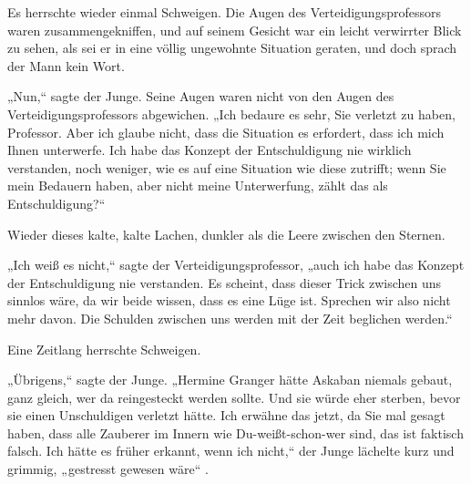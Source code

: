 Es herrschte wieder einmal Schweigen. Die Augen des Verteidigungsprofessors waren zusammengekniffen, und auf seinem Gesicht war ein leicht verwirrter Blick zu sehen, als sei er in eine völlig ungewohnte Situation geraten, und doch sprach der Mann kein Wort.

„Nun,“ sagte der Junge. Seine Augen waren nicht von den Augen des Verteidigungsprofessors abgewichen. „Ich bedaure es sehr, Sie verletzt zu haben, Professor. Aber ich glaube nicht, dass die Situation es erfordert, dass ich mich Ihnen unterwerfe. Ich habe das Konzept der Entschuldigung nie wirklich verstanden, noch weniger, wie es auf eine Situation wie diese zutrifft; wenn Sie mein Bedauern haben, aber nicht meine Unterwerfung, zählt das als Entschuldigung?“

Wieder dieses kalte, kalte Lachen, dunkler als die Leere zwischen den Sternen.

„Ich weiß es nicht,“ sagte der Verteidigungsprofessor, „auch ich habe das Konzept der Entschuldigung nie verstanden. Es scheint, dass dieser Trick zwischen uns sinnlos wäre, da wir beide wissen, dass es eine Lüge ist. Sprechen wir also nicht mehr davon. Die Schulden zwischen uns werden mit der Zeit beglichen werden.“

Eine Zeitlang herrschte Schweigen.

„Übrigens,“ sagte der Junge. „Hermine Granger hätte Askaban niemals gebaut, ganz gleich, wer da reingesteckt werden sollte. Und sie würde eher sterben, bevor sie einen Unschuldigen verletzt hätte. Ich erwähne das jetzt, da Sie mal gesagt haben, dass alle Zauberer im Innern wie Du-weißt-schon-wer sind, das ist faktisch falsch. Ich hätte es früher erkannt, wenn ich nicht,“ der Junge lächelte kurz und grimmig, „gestresst gewesen wäre“ .

